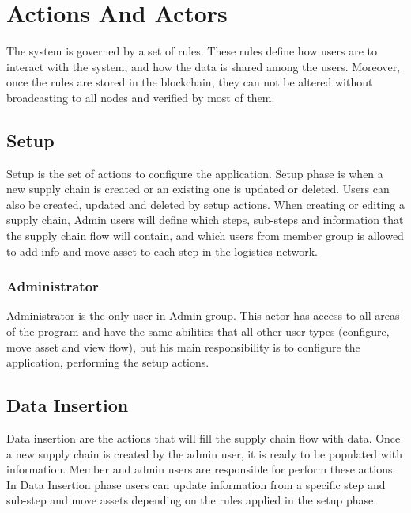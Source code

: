 \section{Actions And Actors}\label{sec:actionsAndActors}

The system is governed by a set of rules. These rules define how users are to interact with the system, and how the data is shared among the users. Moreover, once the rules are stored in the blockchain, they can not be altered without broadcasting to all nodes and verified by most of them.

\subsection{Setup}\label{sec:Setup}
Setup is the set of actions to configure the application. Setup phase is when a new supply chain is created or an existing one is updated or deleted. Users can also be created, updated and deleted by setup actions. When creating or editing a supply chain, Admin users will define which steps, sub-steps and information that the supply chain flow will contain, and which users from member group is allowed to add info and move asset to each step in the logistics network.

\subsubsection{Administrator}\label{sec:Administrator}
Administrator is the only user in Admin group. This actor has access to all areas of the program and have the same abilities that all other user types (configure, move asset and view flow), but his main responsibility is to configure the application, performing the setup actions. 



\subsection{Data Insertion}\label{sec:DataInsertion}

Data insertion are the actions that will fill the supply chain flow with data. Once a new supply chain is created by the admin user, it is ready to be populated with information. Member and admin users are responsible for perform these actions. In Data Insertion phase users can update information from a specific step and sub-step and move assets depending on the rules applied in the setup phase.

